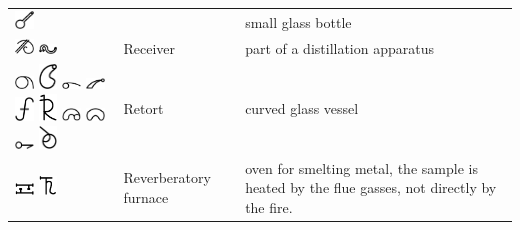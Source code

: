 \documentclass[british,final,landscape]{scrartcl}
\begin{document}
\begin{refsection}
\begin{supertabular}{p{0.3\textwidth}p{0.34\textwidth}p{0.34\textwidth}}
   \includegraphics[width=5mm]{Tools/Phiola} &  & small glass bottle \\
   \includegraphics[width=5mm]{Tools/Receiver} \includegraphics[width=5mm]{Tools/Receiver2} & Receiver & part of a distillation apparatus \\
   \includegraphics[width=5mm]{Tools/Retorte}  \includegraphics[width=5mm]{Tools/Retorte2} \includegraphics[width=5mm]{Tools/Retorte3} \includegraphics[width=5mm]{Tools/Retorte4} \includegraphics[width=5mm]{Tools/Retorte5} \includegraphics[width=5mm]{Tools/Retorte6} \includegraphics[width=5mm]{Tools/Retorte7} \includegraphics[width=5mm]{Tools/Retorte8} \includegraphics[width=5mm]{Tools/Retorte9} \includegraphics[width=5mm]{Tools/Retorte10} & Retort & curved glass vessel \\
   \includegraphics[width=5mm]{Tools/ReverberatoryFurnace} \includegraphics[width=5mm]{Tools/ReverberatoryFurnace2} & Reverberatory furnace & oven for smelting metal, the sample is heated by the flue gasses, not directly by the fire. \\

\end{supertabular}
\end{refsection}
\end{document}

